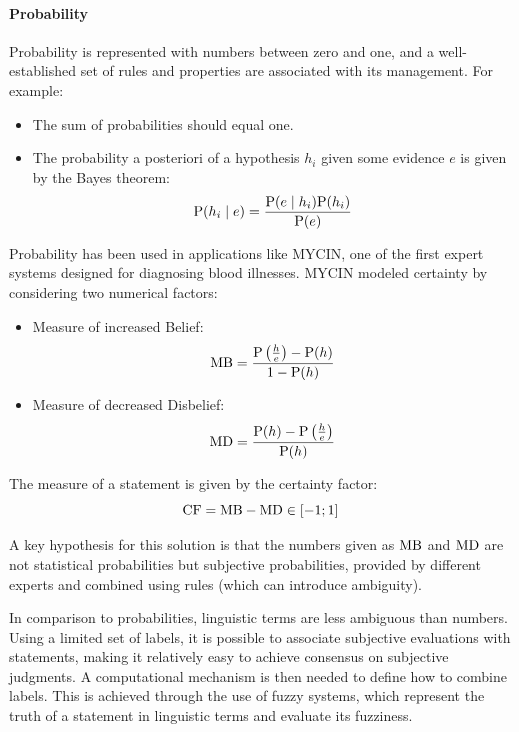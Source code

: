 \paragraph*{Probability}
Probability is represented with numbers between zero and one, and a well-established set of rules and properties are associated with its management. For example:
\begin{itemize}
    \item The sum of probabilities should equal one.
    \item The probability a posteriori of a hypothesis $h_i$ given some evidence $e$ is given by the Bayes theorem:
        \[\textnormal{P}(h_i \mid e)=\dfrac{\textnormal{P}(e \mid h_i)\textnormal{P}(h_i)}{\textnormal{P}(e)}\]
\end{itemize}

Probability has been used in applications like MYCIN, one of the first expert systems designed for diagnosing blood illnesses. 
MYCIN modeled certainty by considering two numerical factors:
\begin{itemize}
    \item Measure of increased Belief: 
        \[\textnormal{MB}=\dfrac{\textnormal{P}\left(\frac{h}{e}\right)-\textnormal{P}(h)}{1-\textnormal{P}(h)}\]
    \item Measure of decreased Disbelief: 
        \[\textnormal{MD}=\dfrac{\textnormal{P}(h)-\textnormal{P}\left(\frac{h}{e}\right)}{\textnormal{P}(h)}\]
\end{itemize}
The measure of a statement is given by the certainty factor:
\[\textnormal{CF}=\textnormal{MB}-\textnormal{MD} \in [-1;1]\]

A key hypothesis for this solution is that the numbers given as $\textnormal{MB}$ and $\textnormal{MD}$ are not statistical probabilities but subjective probabilities, provided by different experts and combined using rules (which can introduce ambiguity).

In comparison to probabilities, linguistic terms are less ambiguous than numbers. 
Using a limited set of labels, it is possible to associate subjective evaluations with statements, making it relatively easy to achieve consensus on subjective judgments. 
A computational mechanism is then needed to define how to combine labels. 
This is achieved through the use of fuzzy systems, which represent the truth of a statement in linguistic terms and evaluate its fuzziness.
